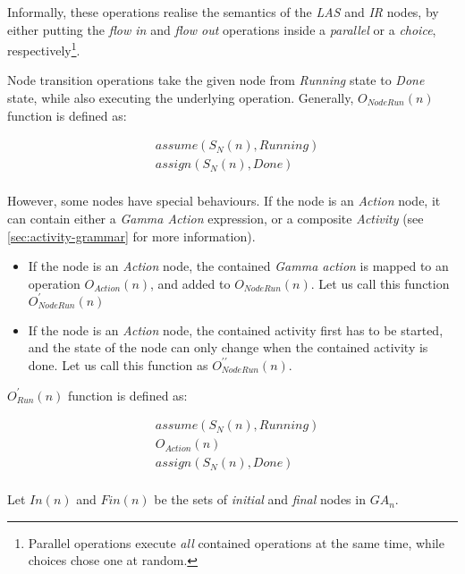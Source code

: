 Informally, these operations realise the semantics of the \emph{LAS} and \emph{IR} nodes, by either putting the \emph{flow in} and \emph{flow out} operations inside a \emph{parallel} or a \emph{choice}, respectively\footnote{Parallel operations execute \emph{all} contained operations at the same time, while choices chose one at random.}.

\begin{definition}
	Node transition operations take the given node from \emph{Running} state to \emph{Done} state, while also executing the underlying operation. Generally, \(O_\mathit{NodeRun}(n)\) function is defined as:
	
	\begin{align*}
		&\mathit{assume}(S_N(n), \mathit{Running}) \\
		&\mathit{assign}(S_N(n), \mathit{Done}) \\
	\end{align*}

	However, some nodes have special behaviours. If the node is an \emph{Action} node, it can contain either a \emph{Gamma Action} expression, or a composite \emph{Activity} (see \autoref{sec:activity-grammar} for more information).

	\begin{itemize}
		\item If the node is an \emph{Action} node, the contained \emph{Gamma action} is mapped to an operation \(O_\mathit{Action}(n)\), and added to \( O_\mathit{NodeRun}(n) \). Let us call this function \(O_\mathit{NodeRun}^\prime(n)\)
		\item If the node is an \emph{Action} node, the contained activity first has to be started, and the state of the node can only change when the contained activity is done. Let us call this function as \(O_\mathit{NodeRun}^{\prime\prime}(n)\).
	\end{itemize}

	\(O_\mathit{Run}^\prime(n)\) function is defined as:
	
	\begin{align*}
		&\mathit{assume}(S_N(n), \mathit{Running}) \\
		&O_\mathit{Action}(n) \\
		&\mathit{assign}(S_N(n), \mathit{Done}) \\
	\end{align*}

	Let \(\mathit{In}(n)\) and \(\mathit{Fin}(n)\) be the sets of \emph{initial} and \emph{final} nodes in \(\mathit{GA}_\mathit{n}\). 
	

\end{definition}

